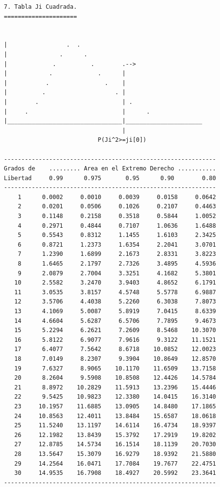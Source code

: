 \begin{verbatim}
7. Tabla Ji Cuadrada.
=====================
 

|                 .  .
|               .      .
|             .          .        .-->
|            .             .      |
|           .                .    |
|          .                    . |
|        .                        | .
|     .                           |      .
|_________________________________|______________________
                                  |
                           P(Ji^2>=ji[0])

-------------------------------------------------------------
Grados de    ......... Area en el Extremo Derecho ...........
Libertad     0.99      0.975       0.95      0.90        0.80
-------------------------------------------------------------
    1      0.0002     0.0010     0.0039     0.0158     0.0642
    2      0.0201     0.0506     0.1026     0.2107     0.4463
    3      0.1148     0.2158     0.3518     0.5844     1.0052
    4      0.2971     0.4844     0.7107     1.0636     1.6488
    5      0.5543     0.8312     1.1455     1.6103     2.3425
    6      0.8721     1.2373     1.6354     2.2041     3.0701
    7      1.2390     1.6899     2.1673     2.8331     3.8223
    8      1.6465     2.1797     2.7326     3.4895     4.5936
    9      2.0879     2.7004     3.3251     4.1682     5.3801
   10      2.5582     3.2470     3.9403     4.8652     6.1791
   11      3.0535     3.8157     4.5748     5.5778     6.9887
   12      3.5706     4.4038     5.2260     6.3038     7.8073
   13      4.1069     5.0087     5.8919     7.0415     8.6339
   14      4.6604     5.6287     6.5706     7.7895     9.4673
   15      5.2294     6.2621     7.2609     8.5468    10.3070
   16      5.8122     6.9077     7.9616     9.3122    11.1521
   17      6.4077     7.5642     8.6718    10.0852    12.0023
   18      7.0149     8.2307     9.3904    10.8649    12.8570
   19      7.6327     8.9065    10.1170    11.6509    13.7158
   20      8.2604     9.5908    10.8508    12.4426    14.5784
   21      8.8972    10.2829    11.5913    13.2396    15.4446
   22      9.5425    10.9823    12.3380    14.0415    16.3140
   23     10.1957    11.6885    13.0905    14.8480    17.1865
   24     10.8563    12.4011    13.8484    15.6587    18.0618
   25     11.5240    13.1197    14.6114    16.4734    18.9397
   26     12.1982    13.8439    15.3792    17.2919    19.8202
   27     12.8785    14.5734    16.1514    18.1139    20.7030
   28     13.5647    15.3079    16.9279    18.9392    21.5880
   29     14.2564    16.0471    17.7084    19.7677    22.4751
   30     14.9535    16.7908    18.4927    20.5992    23.3641
-------------------------------------------------------------





\end{verbatim}
